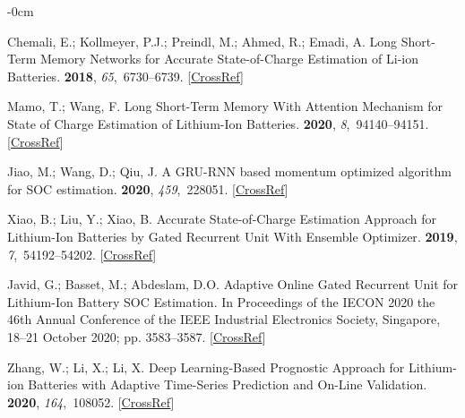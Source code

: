 \documentclass[energies,article,accept,pdftex,moreauthors]{Definitions/mdpi}
\begin{document}
\begin{adjustwidth}{-\extralength}{0cm}
\begin{thebibliography}{999}
    Chemali, E.; Kollmeyer, P.J.; Preindl, M.; Ahmed, R.; Emadi, A.
    \newblock Long {Short}-{Term} {Memory} {Networks} for {Accurate}
    {State}-of-{Charge} {Estimation} of {Li}-ion {Batteries}.
     {\bf 2018}, {\em
    65},~6730--6739. [\href{http://dx.doi.org/10.1109/TIE.2017.2787586}{CrossRef}]
    
    Mamo, T.; Wang, F.
    \newblock Long {Short}-{Term} {Memory} {With} {Attention} {Mechanism} for
    {State} of {Charge} {Estimation} of {Lithium}-{Ion} {Batteries}.
     {\bf 2020}, {\em 8},~94140--94151.
    [\href{http://dx.doi.org/10.1109/ACCESS.2020.2995656}{CrossRef}]
    
    Jiao, M.; Wang, D.; Qiu, J.
    \newblock A {GRU}-{RNN} based momentum optimized algorithm for {SOC}
    estimation.
     {\bf 2020}, {\em 459},~228051.
    [\href{http://dx.doi.org/10.1016/j.jpowsour.2020.228051}{CrossRef}]
    
    Xiao, B.; Liu, Y.; Xiao, B.
    \newblock Accurate {State}-of-{Charge} {Estimation} {Approach} for
    {Lithium}-{Ion} {Batteries} by {Gated} {Recurrent} {Unit} {With} {Ensemble}
    {Optimizer}.
     {\bf 2019}, {\em 7},~54192--54202.
    [\href{http://dx.doi.org/10.1109/ACCESS.2019.2913078}{CrossRef}]
    
    Javid, G.; Basset, M.; Abdeslam, D.O.
    \newblock Adaptive {Online} {Gated} {Recurrent} {Unit} for {Lithium}-{Ion}
    {Battery} {SOC} {Estimation}.
    \newblock In Proceedings of the {IECON} 2020 {the} 46th {Annual} {Conference}
    of the {IEEE} {Industrial} {Electronics} {Society}, Singapore, 18--21 October 2020; pp. 3583--3587. [\href{http://dx.doi.org/10.1109/IECON43393.2020.9254506}{CrossRef}]
    
    Zhang, W.; Li, X.; Li, X.
    \newblock Deep {Learning}-{Based} {Prognostic} {Approach} for {Lithium}-ion
    {Batteries} with {Adaptive} {Time}-{Series} {Prediction} and {On}-{Line}
    {Validation}.
     {\bf 2020}, {\em 164},~108052. [\href{http://dx.doi.org/10.1016/j.measurement.2020.108052}{CrossRef}]
    

\end{thebibliography}
\end{adjustwidth}
\end{document}
